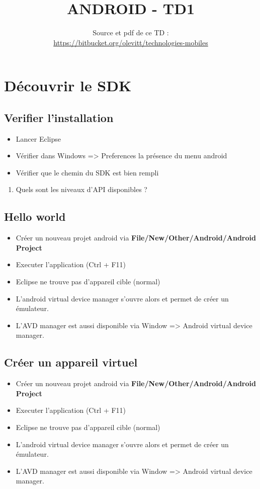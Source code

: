 \documentclass{article}
\title{ANDROID - TD1}
\date{Source et pdf de ce TD
:\\\url{https://bitbucket.org/olevitt/technologies-mobiles}}
\begin{document}
\section{Découvrir le SDK}
\subsection{Verifier l'installation}
\begin{itemize}
\item Lancer Eclipse
\item Vérifier dans Windows => Preferences la présence du menu android
\item Vérifier que le chemin du SDK est bien rempli
\end{itemize}
\begin{enumerate}
\item Quels sont les niveaux d'API disponibles ?
\end{enumerate}
\subsection{Hello world}
\begin{itemize}
\item Créer un nouveau projet android via \textbf{File/New/Other/Android/Android
Project}
\item Executer l'application (Ctrl + F11)
\item Eclipse ne trouve pas d'appareil cible (normal)
\item L'android virtual device manager s'ouvre alors et permet de créer un
émulateur.
\item L'AVD manager est aussi disponible via Window => Android virtual
device manager.
\end{itemize}
\subsection{Créer un appareil virtuel}
\begin{itemize}
\item Créer un nouveau projet android via \textbf{File/New/Other/Android/Android
Project}
\item Executer l'application (Ctrl + F11)
\item Eclipse ne trouve pas d'appareil cible (normal)
\item L'android virtual device manager s'ouvre alors et permet de créer un
émulateur.
\item L'AVD manager est aussi disponible via Window => Android virtual
device manager.
\end{itemize}
\end{document}
